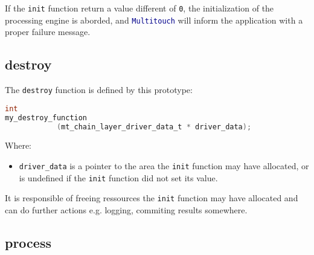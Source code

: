 If the \texttt{init} function return a value different of \texttt{0}, the
initialization of the processing engine is aborded, and 
\texttt{\textcolor{darkblue}{Multitouch}} will inform the application
with a proper failure message.


%
%
\subsection{destroy}
\label{sect:pengine_destroy}

The \texttt{destroy} function is defined by this prototype:
\begin{lstlisting}[language=C,
caption=Processing engine's exit function prototype]
int 
my_destroy_function
            (mt_chain_layer_driver_data_t * driver_data);
\end{lstlisting}
Where:
\begin{itemize}
\item \texttt{driver\_data} is a pointer to the area the 
\texttt{init} function may have allocated, or is undefined if 
the \texttt{init} function did not set its value.
\end{itemize}

It is responsible of freeing ressources the \texttt{init} function 
may have allocated and can do further actions e.g. logging, 
commiting results somewhere. 


%
%
\subsection{process}
\label{sect:pengine_process}

